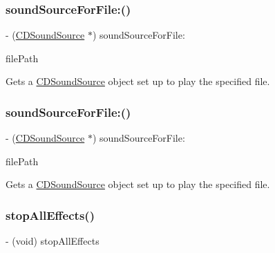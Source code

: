 \subsubsection{\texorpdfstring{sound\+Source\+For\+File\+:()}{soundSourceForFile:()}\hspace{0.1cm}{\footnotesize\ttfamily [3/4]}}
{\footnotesize\ttfamily -\/ (\hyperlink{interfaceCDSoundSource}{C\+D\+Sound\+Source} $\ast$) sound\+Source\+For\+File\+: \begin{DoxyParamCaption}\item[{(N\+S\+String$\ast$)}]{file\+Path }\end{DoxyParamCaption}}

Gets a \hyperlink{interfaceCDSoundSource}{C\+D\+Sound\+Source} object set up to play the specified file. \mbox{\label{interfaceSimpleAudioEngine_a8ab8450895ef35d23744db31e5826d01}} 
\subsubsection{\texorpdfstring{sound\+Source\+For\+File\+:()}{soundSourceForFile:()}\hspace{0.1cm}{\footnotesize\ttfamily [4/4]}}
{\footnotesize\ttfamily -\/ (\hyperlink{interfaceCDSoundSource}{C\+D\+Sound\+Source} $\ast$) sound\+Source\+For\+File\+: \begin{DoxyParamCaption}\item[{(N\+S\+String $\ast$)}]{file\+Path }\end{DoxyParamCaption}}

Gets a \hyperlink{interfaceCDSoundSource}{C\+D\+Sound\+Source} object set up to play the specified file. \mbox{\label{interfaceSimpleAudioEngine_a41cac6b6201c29a06ce18e52191520de}} 
\subsubsection{\texorpdfstring{stop\+All\+Effects()}{stopAllEffects()}\hspace{0.1cm}{\footnotesize\ttfamily [1/4]}}
{\footnotesize\ttfamily -\/ (void) stop\+All\+Effects \begin{DoxyParamCaption}{ }\end{DoxyParamCaption}}

